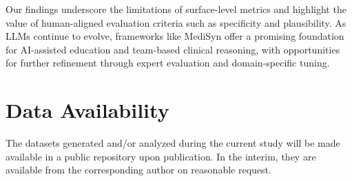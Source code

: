 \documentclass[pdflatex,sn-mathphys-num]{sn-jnl}%
\theoremstyle{thmstyleone}%
\theoremstyle{thmstyletwo}%
\theoremstyle{thmstylethree}%
\begin{document}
Our findings underscore the limitations of surface-level metrics and highlight the value of human-aligned evaluation criteria such as specificity and plausibility. As LLMs continue to evolve, frameworks like MediSyn offer a promising foundation for AI-assisted education and team-based clinical reasoning, with opportunities for further refinement through expert evaluation and domain-specific tuning.


\section*{Data Availability}
The datasets generated and/or analyzed during the current study will be made available in a public repository upon publication. In the interim, they are available from the corresponding author on reasonable request.
\end{document}

